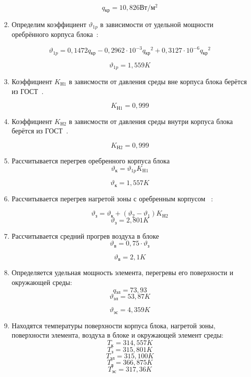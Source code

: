 \begin{enumerate}[label={\arabic*.}]
    $$q\mathrm{_{кр}} = 10,826 \mathrm{Вт/м^2}$$

\item
    Определим коэффициент $\vartheta_{1p}$ в зависимости от удельной
    мощности оребрённого корпуса блока~\cite{Rotkop1976}:

\begin{equation}
\vartheta_{1p} = 0,1472q\mathrm{_{кр}} - 0,2962 \cdot 10^{-3}q\mathrm{_{кр}}^2 + 0,3127 \cdot 10^{-6}q\mathrm{_{кр}}^2      
\end{equation}

$$\vartheta_{1p}= 1,559K$$

\item Коэффициент $K\mathrm{_{Н1}}$ в зависмости от давления
  среды вне корпуса блока берётся из ГОСТ~\cite{GOST-15150-69}.

  $$K\mathrm{_{Н1}} = 0,999$$


\item Коэффициент $K\mathrm{_{Н2}}$ в зависмости от давления
  среды внутри корпуса блока берётся из ГОСТ~\cite{GOST-15150-69}.

  $$K\mathrm{_{Н2}} = 0,999$$

\item Рассчитывается перегрев оребренного корпуса блока
  \begin{equation}
    \vartheta\mathrm{_к} =\vartheta{_{1p}}K\mathrm{_{H1}}
  \end{equation}

  $$\vartheta\mathrm{_к} = 1,557K$$

\item Рассчитывается
  перегрев нагретой зоны
  с оребренным корпусом ~\cite{Rotkop1976}:

\begin{equation}
    \vartheta\mathrm{_з} = \vartheta{_к} +(\vartheta_2 - \vartheta_1)K\mathrm{_{Н2}}
  \end{equation}
  $$\vartheta\mathrm{_з} = 2,801K$$

\item Рассчитывается средний прогрев воздуха в блоке
  \begin{equation}
    \vartheta\mathrm{_в} = 0,75 \cdot \vartheta\mathrm{_з}
  \end{equation}
  
  $$\vartheta\mathrm{_в} = 2,1K$$

\item Определяется удельная мощность элемента, перегревы его
    поверхности и окружающей среды:
    $$q\mathrm{_{эл}} =73,93$$
    $$\vartheta\mathrm{_{эл}} = 53,87 K$$

    $$\vartheta\mathrm{_{эс}} = 4,359 K$$

  \item Находятся температуры поверхности корпуса блока, нагретой
зоны, поверхности элемента, воздуха в блоке и окружающей элемент
среды:
$$T\mathrm{_{к}} = 314,557 K$$
$$T\mathrm{_з} = 315,801 K$$
$$T\mathrm{_{эл}} = 315,100 K$$
$$T\mathrm{_{в}} = 366,875 K$$
$$T\mathrm{_{эс}} =317,36 K$$

\end{enumerate}